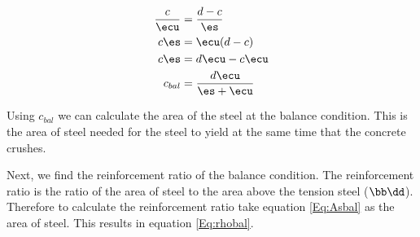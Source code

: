 \documentclass{../../../ExampleProblem}
\begin{document}
\begin{align}
\frac{c}{\ecu} &=\frac{d-c}{\es}\\
c\es &= \ecu(d-c)\\
c\es &= d\ecu - c \ecu\\
c_{bal}&=\frac{d\ecu}{\es+\ecu}
\end{align}

Using $c_{bal}$ we can calculate the area of the steel \As at the balance condition. This is the area of steel needed for the steel to yield at the same time that the concrete crushes.


Next, we find the reinforcement ratio of the balance condition. The reinforcement ratio is the ratio of the area of steel to the area above the tension steel ($\bb\dd$). Therefore to calculate the reinforcement ratio take equation \ref{Eq:Asbal} as the area of steel. This results in equation \ref{Eq:rhobal}.

\end{document}
